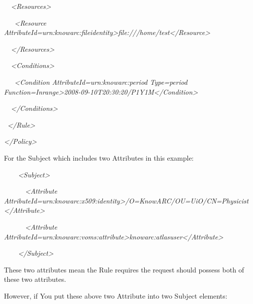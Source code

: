 \documentclass{article}
\begin{document}
{\color{black}
\textit{\ \ }\textit{{\textless}Resources{\textgreater}}}

{\color{black}
\textit{\ \ \ }\textit{{\textless}Resource
AttributeId={\textquotedbl}urn:knowarc:fileidentity{\textquotedbl}{\textgreater}file:///home/test{\textless}/Resource{\textgreater}}}

{\color{black}
\textit{\ \ }\textit{{\textless}/Resources{\textgreater}}}

{\color{black}
\textit{\ \ }\textit{{\textless}Conditions{\textgreater}}}

{\color{black}
\textit{\ \ \ }\textit{{\textless}Condition
AttributeId={\textquotedbl}urn:knowarc:period{\textquotedbl}
Type={\textquotedbl}period{\textquotedbl}
Function={\textquotedbl}Inrange{\textquotedbl}{\textgreater}2008-09-10T20:30:20/P1Y1M{\textless}/Condition{\textgreater}}}

{\color{black}
\textit{\ \ }\textit{{\textless}/Conditions{\textgreater}}}

{\color{black}
\textit{\ }\textit{{\textless}/Rule{\textgreater}}}

{\itshape\color{black}
{\textless}/Policy{\textgreater}}

{\upshape\color{black}
For the Subject which includes two Attributes in this example:}

{\color{black}
\textit{\ \ \ \ }\textit{{\textless}Subject{\textgreater}}}

{\color{black}
\textit{\ \ \ \ \ \ }\textit{{\textless}Attribute
AttributeId={\textquotedbl}urn:knowarc:x509:identity{\textquotedbl}{\textgreater}/O=KnowARC/OU=UiO/CN=Physicist{\textless}/Attribute{\textgreater}}}

{\color{black}
\textit{\ \ \ \ \ \ }\textit{{\textless}Attribute
AttributeId={\textquotedbl}urn:knowarc:voms:attribute{\textgreater}knowarc:atlasuser{\textless}/Attribute{\textgreater}}}

{\color{black}
\textit{\ \ \ \ }\textit{{\textless}/Subject{\textgreater}}}

{\upshape\color{black}
These two attributes mean the Rule requires the request should possess
both of these two attributes.}

{\color{black}
However, if You put these above two Attribute into two Subject
elements:}
\end{document}
